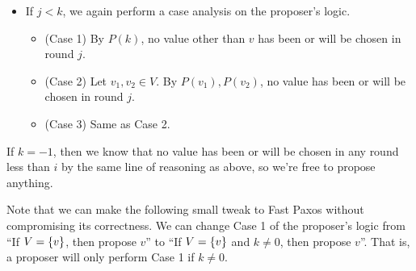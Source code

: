 \documentclass{mwhittaker}
\begin{document}
\begin{appendices}
\begin{itemize}
  \item
    If $j < k$, we again perform a case analysis on the proposer's logic.
    \begin{itemize}
      \item
        (Case 1) By $P(k)$, no value other than $v$ has been or will be chosen
        in round $j$.
      \item
        (Case 2) Let $v_1, v_2 \in V$. By $P(v_1), P(v_2)$, no value has been
        or will be chosen in round $j$.
      \item
        (Case 3) Same as Case 2.
    \end{itemize}
\end{itemize}
If $k = -1$, then we know that no value has been or will be chosen in any round
less than $i$ by the same line of reasoning as above, so we're free to propose
anything.

Note that we can make the following small tweak to Fast Paxos without
compromising its correctness. We can change Case 1 of the proposer's logic from
``If $V = \{v\}$, then propose $v$'' to ``If $V = \{v\}$ and $k \neq 0$,
then propose $v$''. That is, a proposer will only perform Case 1 if $k \neq 0$.

\end{appendices}
\end{document}
